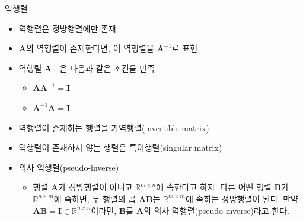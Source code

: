 \documentclass{beamer}
\begin{document}
\begin{frame}{역행렬}


\begin{itemize}
\item 역행렬은 정방행렬에만 존재
\item $\mathbf A$의 역행렬이 존재한다면, 이 역행렬을 $\mathbf A^{-1}$로 표현
\item 역행렬 $\mathbf A^{-1}$은 다음과 같은 조건을 만족
	\begin{itemize}
	\item $\mathbf {AA}^{-1} = \mathbf I$
	\item $\mathbf A^{-1} \mathbf A = \mathbf I$
	\end{itemize}
\end{itemize}

\begin{itemize}
\item 역행렬이 존재하는 행렬을 가역행렬(invertible matrix)
\item 역행렬이 존재하지 않는 행렬은 특이행렬(singular matrix)
\end{itemize}

\begin{itemize}
\item 의사 역행렬(pseudo-inverse)
	\begin{itemize}
	\item  행렬 $\mathbf A$가 정방행렬이 아니고 $\mathbb R^{m \times n}$에 속한다고 하자. 다른 어떤 행렬 $\mathbf B$가 $\mathbb R^{n \times m}$에 속하면, 두 행렬의 곱 $\mathbf {AB}$는 $\mathbb R^{m \times m}$에 속하는 정방행렬이 된다. 만약 $\mathbf {AB} = \mathbf I \in \mathbb R^{n \times n}$이라면, $\mathbf B$를 $\mathbf A$의 의사 역행렬(pseudo-inverse)라고 한다.
	\end{itemize}
\end{itemize}
\end{frame}
\end{document}
